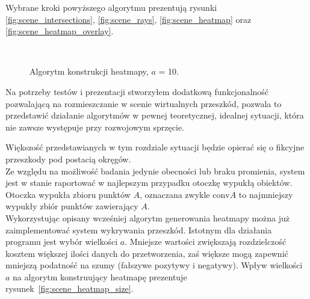 Wybrane kroki powyższego algorytmu prezentują rysunki \ref{fig:scene_intersections}, \ref{fig:scene_rays}, \ref{fig:scene_heatmap} oraz \ref{fig:scene_heatmap_overlay}.

\begin{sidewaysfigure}[tbh]
  \myfloatalign
   \quad
   \\
   \quad
  \caption[Algorytm konstrukcji heatmapy]{Algorytm konstrukcji heatmapy, $a$ = 10.}\label{fig:scene_heatmap_algorithm}
\end{sidewaysfigure}

Na potrzeby testów i prezentacji stworzyłem dodatkową funkcjonalność pozwalającą na rozmieszczanie w scenie wirtualnych przeszkód, pozwala to przedstawić działanie algorytmów w pewnej teoretycznej, idealnej sytuacji, która nie zawsze występuje przy rozwojowym sprzęcie.

Większość przedstawianych w tym rozdziale sytuacji będzie opierać się o fikcyjne przeszkody pod postacią okręgów.\\

Ze względu na możliwość badania jedynie obecności lub braku promienia, system jest w stanie raportować w najlepszym przypadku otoczkę wypukłą obiektów. Otoczka wypukła zbioru punktów $A$, oznaczana zwykle $\mbox{conv} A$ to najmniejszy wypukły zbiór punktów zawierający $A$.\\

Wykorzystując opisany wcześniej algorytm generowania heatmapy można już zaimplementować system wykrywania przeszkód. Istotnym dla działania programu jest wybór wielkości $a$. Mniejsze wartości zwiększają rozdzielczość kosztem większej ilości danych do przetworzenia, zaś większe mogą zapewnić mniejszą podatność na szumy (fałszywe pozytywy i negatywy). Wpływ wielkości $a$ na algorytm konstruujący heatmapę prezentuje rysunek~\ref{fig:scene_heatmap_size}.

